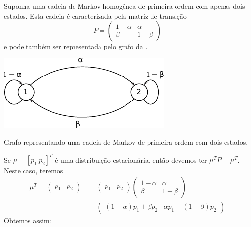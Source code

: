 \begin{example}\label{ex:markovsimples2}
  Suponha uma cadeia de Markov homogênea de primeira ordem com apenas dois estados.
  Esta cadeia é caracterizada pela matriz de transição
  \begin{equation}
    P = \begin{pmatrix} 1 - \alpha & \alpha \\ \beta & 1 - \beta \end{pmatrix}
  \end{equation}
  e pode também ser representada pelo grafo da .
  \begin{marginfigure}%
  \includegraphics[width=\linewidth]{figures/markov-example2.pdf}
  \caption{Grafo representando uma cadeia de Markov de primeira ordem com dois estados.}
  \label{fig:markov-example2}
  \end{marginfigure}
  Se $\mu = [p_1 \ p_2]^T$ é uma distribuição estacionária, então devemos ter $\mu^T P = \mu^T$.
  Neste caso, teremos
  \begin{subequations}
  \begin{align}
    \mu^T = \begin{pmatrix} p_1 & p_2 \end{pmatrix} &= \begin{pmatrix} p_1 & p_2 \end{pmatrix} \begin{pmatrix} 1 - \alpha & \alpha \\ \beta & 1 - \beta \end{pmatrix} \\
          &= \begin{pmatrix} (1-\alpha) p_1 + \beta p_2 & \alpha p_1 + (1-\beta) p_2 \end{pmatrix}
  \end{align}
  \end{subequations}
  Obtemos assim:

\end{example}
